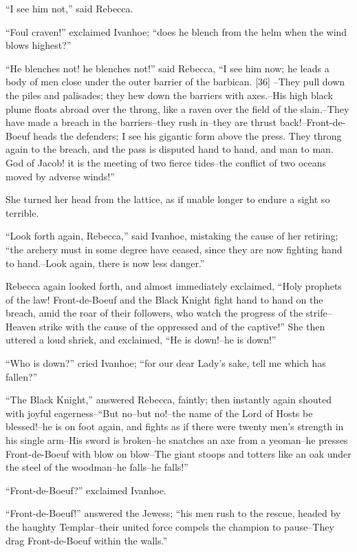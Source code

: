 ``I see him not,'' said Rebecca.

``Foul craven!'' exclaimed Ivanhoe; ``does he blench from the helm when
the wind blows highest?''

``He blenches not! he blenches not!'' said Rebecca, ``I see him now; he
leads a body of men close under the outer barrier of the barbican.
{[}36{]} --They pull down the piles and palisades; they hew down the
barriers with axes.--His high black plume floats abroad over the throng,
like a raven over the field of the slain.--They have made a breach in
the barriers--they rush in--they are thrust back!--Front-de-Boeuf heads
the defenders; I see his gigantic form above the press. They throng
again to the breach, and the pass is disputed hand to hand, and man to
man. God of Jacob! it is the meeting of two fierce tides--the conflict
of two oceans moved by adverse winds!''

She turned her head from the lattice, as if unable longer to endure a
sight so terrible.

``Look forth again, Rebecca,'' said Ivanhoe, mistaking the cause of her
retiring; ``the archery must in some degree have ceased, since they are
now fighting hand to hand.--Look again, there is now less danger.''

Rebecca again looked forth, and almost immediately exclaimed, ``Holy
prophets of the law! Front-de-Boeuf and the Black Knight fight hand to
hand on the breach, amid the roar of their followers, who watch the
progress of the strife--Heaven strike with the cause of the oppressed
and of the captive!'' She then uttered a loud shriek, and exclaimed,
``He is down!--he is down!''

``Who is down?'' cried Ivanhoe; ``for our dear Lady's sake, tell me
which has fallen?''

``The Black Knight,'' answered Rebecca, faintly; then instantly again
shouted with joyful eagerness--``But no--but no!--the name of the Lord
of Hosts be blessed!--he is on foot again, and fights as if there were
twenty men's strength in his single arm--His sword is broken--he
snatches an axe from a yeoman--he presses Front-de-Boeuf with blow on
blow--The giant stoops and totters like an oak under the steel of the
woodman--he falls--he falls!''

``Front-de-Boeuf?'' exclaimed Ivanhoe.

``Front-de-Boeuf!'' answered the Jewess; ``his men rush to the rescue,
headed by the haughty Templar--their united force compels the champion
to pause--They drag Front-de-Boeuf within the walls.''


